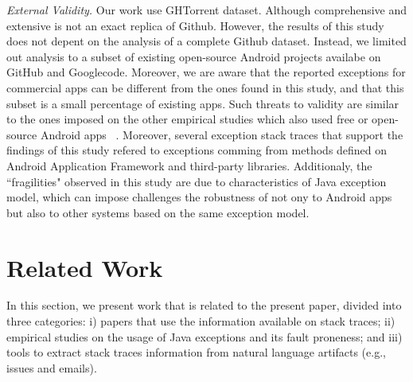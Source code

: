 \documentclass[conference]{IEEEtran}
\begin{document}
\noindent\emph{External Validity.} Our work use GHTorrent dataset. Although 
comprehensive and extensive is not an exact replica of Github. 
However, the results of this study does not depent on the analysis of
a complete Github dataset. Instead, we limited out analysis to a subset of
existing open-source Android projects availabe on GitHub and Googlecode.
Moreover, we are aware that the reported exceptions 
for commercial apps can be different from the ones found in this study, and that
this subset is a small percentage of existing apps.
Such threats to validity are similar to the ones imposed on the other empirical studies 
which also used free or open-source Android apps ~\cite{Linar13,McDon13,ahimed}.
Moreover,  several exception stack traces that support the findings of this study
refered to exceptions comming from methods defined on Android Application Framework
and third-party libraries.  Additionaly,  the ``fragilities" observed in this study are due to
characteristics of Java exception model, which can impose challenges 
the robustness of not ony to Android apps but also to other systems
 based on the same exception model. 


\section{Related Work}
\label{sec:rele}

In this section, we present work that is related to the present paper, divided into
three categories: i) papers that use the information available on stack traces;
ii) empirical studies on the usage of Java exceptions and its fault proneness;
and iii) tools to extract stack traces information from natural language artifacts
(e.g., issues and emails).
\end{document}
